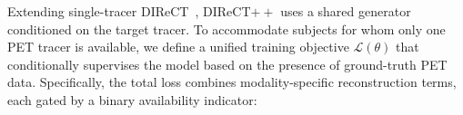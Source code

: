 Extending single-tracer DIReCT~\cite{liu2025direct}, DIReCT$++$ uses a shared generator conditioned on the target tracer. To accommodate subjects for whom only one PET tracer is available, we define a unified training objective $\mathcal{L}(\theta)$ that conditionally supervises the model based on the presence of ground-truth PET data. Specifically, the total loss combines modality-specific reconstruction terms, each gated by a binary availability indicator:
